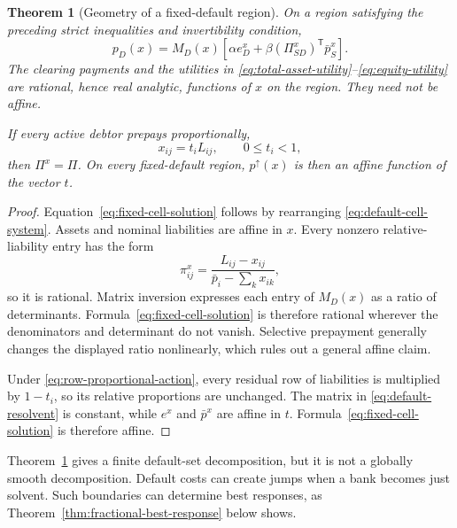 \documentclass[11pt]{article}
\newtheorem{theorem}{Theorem}[section]
\theoremstyle{definition}
\theoremstyle{remark}
\newcommand{\pbar}{\bar p}
\begin{document}
\begin{theorem}[Geometry of a fixed-default region]
\label{thm:fixed-default-geometry}
On a region satisfying the preceding strict inequalities and invertibility
condition,
\begin{equation}\label{eq:fixed-cell-solution}
  p_D(x)=M_D(x)
  \left[
    \alpha e_D^x
    +\beta(\Pi_{SD}^x)^{\mathsf T}\pbar_S^x
  \right].
\end{equation}
The clearing payments and the utilities in
\eqref{eq:total-asset-utility}--\eqref{eq:equity-utility} are rational, hence
real analytic, functions of $x$ on the region.  They need not be affine.

If every active debtor prepays proportionally,
\begin{equation}\label{eq:row-proportional-action}
  x_{ij}=t_iL_{ij},
  \qquad 0\leq t_i<1,
\end{equation}
then $\Pi^x=\Pi$.  On every fixed-default region, $p^\uparrow(x)$ is then an
affine function of the vector $t$.
\end{theorem}

\begin{proof}
Equation~\eqref{eq:fixed-cell-solution} follows by rearranging
\eqref{eq:default-cell-system}.  Assets and nominal liabilities are affine in
$x$.  Every nonzero relative-liability entry has the form
\begin{equation}
  \pi_{ij}^x=\frac{L_{ij}-x_{ij}}
  {\pbar_i-\sum_kx_{ik}},
\end{equation}
so it is rational.  Matrix inversion expresses each entry of $M_D(x)$ as a
ratio of determinants.  Formula~\eqref{eq:fixed-cell-solution} is therefore
rational wherever the denominators and determinant do not vanish.  Selective
prepayment generally changes the displayed ratio nonlinearly, which rules out
a general affine claim.

Under \eqref{eq:row-proportional-action}, every residual row of liabilities is
multiplied by $1-t_i$, so its relative proportions are unchanged.  The matrix
in \eqref{eq:default-resolvent} is constant, while $e^x$ and $\pbar^x$ are
affine in $t$.  Formula~\eqref{eq:fixed-cell-solution} is therefore affine.
\end{proof}

Theorem~\ref{thm:fixed-default-geometry} gives a finite default-set
decomposition, but it is not a globally smooth decomposition.  Default
costs can create jumps when a bank becomes just solvent.  Such boundaries can
determine best responses, as Theorem~\ref{thm:fractional-best-response} below
shows.
\end{document}
